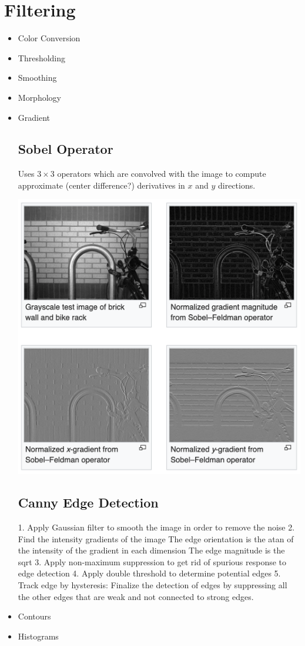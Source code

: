 \section{ Filtering}
\begin{itemize}
\item Color Conversion

\item Thresholding
\item Smoothing

\item Morphology
\item Gradient

\subsection{Sobel Operator}

Uses $3\times3$ operators which are convolved with the image to compute approximate (center difference?) derivatives in $x$ and $y$ directions.

\includegraphics[width=0.9\columnwidth]{img_proc/sobel.png}

\subsection{Canny Edge Detection}
1. Apply Gaussian filter to smooth the image in order to remove the noise
2. Find the intensity gradients of the image
	The edge orientation is the atan of the intensity of the gradient in each dimension
	The edge magnitude is the sqrt
3. Apply non-maximum suppression to get rid of spurious response to edge detection
4. Apply double threshold to determine potential edges
5. Track edge by hysteresis: Finalize the detection of edges by suppressing all the other edges that are weak and not connected to strong edges.

\item Contours
\item Histograms
\end{itemize}

